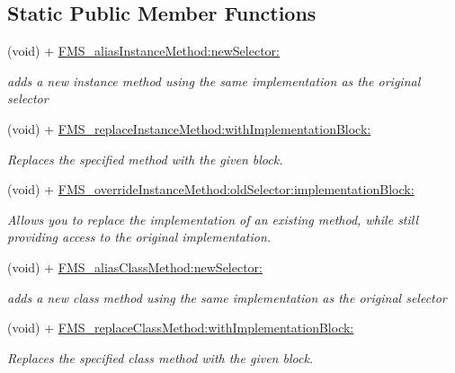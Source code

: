\subsection*{Static Public Member Functions}
\begin{DoxyCompactItemize}
\item 
(void) + \hyperlink{category_n_s_object_07_f_m_s___swizzler_08_a3b21e8a4c6a7668de51f77ba308cc4fe}{F\-M\-S\-\_\-alias\-Instance\-Method\-:new\-Selector\-:}
\begin{DoxyCompactList}\small\item\em adds a new instance method using the same implementation as the original selector \end{DoxyCompactList}\item 
(void) + \hyperlink{category_n_s_object_07_f_m_s___swizzler_08_ac4c9e082d74e163f82d2cd429f735a89}{F\-M\-S\-\_\-replace\-Instance\-Method\-:with\-Implementation\-Block\-:}
\begin{DoxyCompactList}\small\item\em Replaces the specified method with the given block. \end{DoxyCompactList}\item 
(void) + \hyperlink{category_n_s_object_07_f_m_s___swizzler_08_a7acd4f5c709742f78301d791530fc698}{F\-M\-S\-\_\-override\-Instance\-Method\-:old\-Selector\-:implementation\-Block\-:}
\begin{DoxyCompactList}\small\item\em Allows you to replace the implementation of an existing method, while still providing access to the original implementation. \end{DoxyCompactList}\item 
(void) + \hyperlink{category_n_s_object_07_f_m_s___swizzler_08_a8abadede831b1fabdf944cf802c19011}{F\-M\-S\-\_\-alias\-Class\-Method\-:new\-Selector\-:}
\begin{DoxyCompactList}\small\item\em adds a new class method using the same implementation as the original selector \end{DoxyCompactList}\item 
(void) + \hyperlink{category_n_s_object_07_f_m_s___swizzler_08_ada43393ead6d6976de66fd0df1211e3d}{F\-M\-S\-\_\-replace\-Class\-Method\-:with\-Implementation\-Block\-:}
\begin{DoxyCompactList}\small\item\em Replaces the specified class method with the given block. \end{DoxyCompactList}\item 

\end{DoxyCompactItemize}
